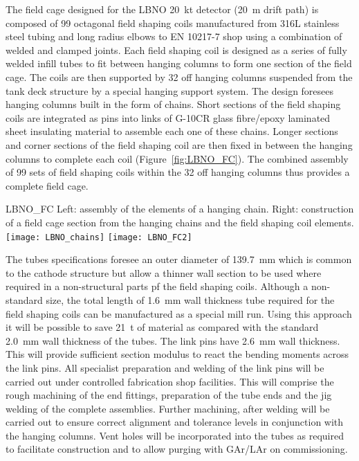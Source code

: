 The field cage designed for the LBNO 20~kt detector (20~m drift
path) is composed of 99 octagonal field shaping coils manufactured
from 316L stainless steel tubing and long radius elbows to EN 10217-7
shop using a combination of welded and clamped joints. Each field
shaping coil is designed as a series of fully welded infill tubes to
fit between hanging columns to form one section of the field cage. The
coils are then supported by 32 off hanging columns suspended from the
tank deck structure by a special hanging support system. The design
foresees hanging columns built in the form of chains. Short sections
of the field shaping coils are integrated as pins into links of G-10CR
glass fibre/epoxy laminated sheet insulating material to assemble each
one of these chains. Longer sections and corner sections of the field
shaping coil are then fixed in between the hanging columns to complete
each coil (Figure~\ref{fig:LBNO_FC}). The combined assembly of 99 sets
of field shaping coils within the 32 off hanging columns thus provides
a complete field cage.
\begin{cdrfigure}{LBNO_FC}
{\small Left: assembly of the elements of a hanging chain. Right: 
construction of a field cage section from the hanging chains and the field shaping coil elements.}
\texttt{[image: LBNO\_chains]} \hfill
\texttt{[image: LBNO\_FC2]}
\end{cdrfigure}

The tubes specifications foresee an outer diameter of 139.7~mm which
is common to the cathode structure but allow a thinner wall section to
be used where required in a non-structural parts pf the field shaping
coils.  Although a non-standard size, the total length of 1.6~mm wall
thickness tube required for the field shaping coils can be
manufactured as a special mill run.  Using this approach it will be
possible to save 21~t of material as compared with the standard
2.0~mm wall thickness of the tubes. The link pins have 2.6~mm wall
thickness. This will provide sufficient section modulus to react the
bending moments across the link pins. All specialist preparation and
welding of the link pins will be carried out under controlled
fabrication shop facilities.  This will comprise the rough machining
of the end fittings, preparation of the tube ends and the jig welding
of the complete assemblies. Further machining, after welding will be
carried out to ensure correct alignment and tolerance levels in
conjunction with the hanging columns.  Vent holes will be incorporated
into the tubes as required to facilitate construction and to allow
purging with GAr/LAr on commissioning.

